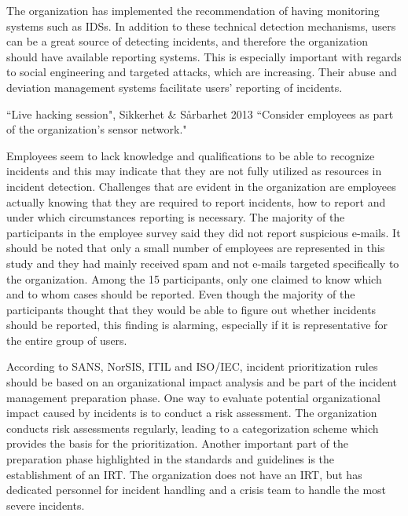 The organization has implemented the recommendation of having monitoring systems such as IDSs. In addition to these technical detection mechanisms, users can be a great source of detecting incidents, and therefore the organization should have available reporting systems. This is especially important with regards to social engineering and targeted attacks, which are increasing. Their abuse and deviation management systems facilitate users' reporting of incidents. 

\begin{newquote}{``Live hacking session", Sikkerhet \& S\aa rbarhet 2013}
``Consider employees as part of the organization's sensor network."
\end{newquote}

Employees seem to lack knowledge and qualifications to be able to recognize incidents and this may indicate that they are not fully utilized as resources in incident detection. Challenges that are evident in the organization are employees actually knowing that they are required to report incidents, how to report and under which circumstances reporting is necessary. The majority of the participants in the employee survey said they did not report suspicious e-mails. It should be noted that only a small number of employees are represented in this study and they had mainly received spam and not e-mails targeted specifically to the organization. Among the 15 participants, only one claimed to know which and to whom cases should be reported. Even though the majority of the participants thought that they would be able to figure out whether incidents should be reported, this finding is alarming, especially if it is representative for the entire group of users. 

According to SANS, NorSIS, ITIL and ISO/IEC, incident prioritization rules should be based on an organizational impact analysis and be part of the incident management preparation phase. One way to evaluate potential organizational impact caused by incidents is to conduct a risk assessment. The organization conducts risk assessments regularly, leading to a categorization scheme which provides the basis for the prioritization. Another important part of the preparation phase highlighted in the standards and guidelines is the establishment of an \ac{IRT}. The organization does not have an \ac{IRT}, but has dedicated personnel for incident handling and a crisis team to handle the most severe incidents.

